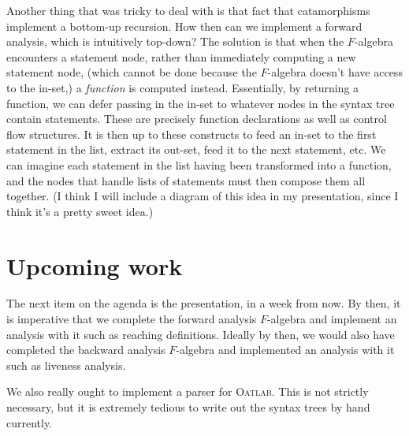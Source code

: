 \documentclass[letterpaper,11pt]{article}
\newcommand{\oatlab}{\textsc{Oatlab}}
\begin{document}
Another thing that was tricky to deal with is that fact that catamorphisms
implement a bottom-up recursion. How then can we implement a forward analysis,
which is intuitively top-down? The solution is that when the $F$-algebra
encounters a statement node, rather than immediately computing a new statement
node, (which cannot be done because the $F$-algebra doesn't have access to
the in-set,) a \emph{function} is computed instead. Essentially, by returning a
function, we can defer passing in the in-set to whatever nodes in the syntax
tree contain statements. These are precisely function declarations as well as
control flow structures. It is then up to these constructs to feed an in-set to
the first statement in the list, extract its out-set, feed it to the next
statement, etc. We can imagine each statement in the list having been
transformed into a function, and the nodes that handle lists of statements must
then compose them all together. (I think I will include a diagram of this idea
in my presentation, since I think it's a pretty sweet idea.)

\section{Upcoming work}

The next item on the agenda is the presentation, in a week from now. By then,
it is imperative that we complete the forward analysis $F$-algebra and
implement an analysis with it such as reaching definitions. Ideally by then,
we would also have completed the backward analysis $F$-algebra and implemented
an analysis with it such as liveness analysis.

We also really ought to implement a parser for \oatlab{}. This is not strictly
necessary, but it is extremely tedious to write out the syntax trees by hand
currently.
\end{document}
